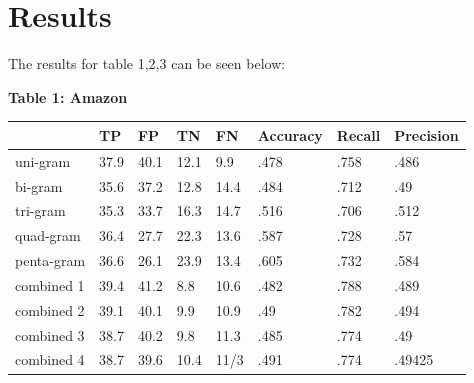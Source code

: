 \documentclass[12pt]{article}
\begin{document}
\section{Results}
The results for table 1,2,3 can be seen below: 
 \begin{flushleft}
\begin{table}[hbt!]
    \begin{center}
       \textbf{Table 1: Amazon} \\
       \end{center}
        \begin{tabular}{l|l|l|l|l|l|l|l|}
            \cline{2-7}
            
            \cline{2-7}
             & TP & FP & TN & FN  & Accuracy & Recall & Precision\\
            \hline
            \multicolumn{1}{|l|}{uni-gram} & 37.9 & 40.1 & 12.1 & 9.9 & .478 & .758  & .486 \\
            \hline
            \hline
            \multicolumn{1}{|l|}{bi-gram} & 35.6 & 37.2 & 12.8 & 14.4 & .484 & .712  & .49  \\
            \hline
            \hline
            \multicolumn{1}{|l|}{tri-gram} & 35.3 & 33.7 & 16.3  & 14.7 & .516 & .706  & .512 \\
            \hline
            \hline
            \multicolumn{1}{|l|}{quad-gram} & 36.4 & 27.7 & 22.3  & 13.6 & .587 & .728 & .57 \\
            \hline
            \hline
            \multicolumn{1}{|l|}{penta-gram} & 36.6 & 26.1 & 23.9  & 13.4 & .605  & .732  & .584 \\
            \hline
            \hline
            \multicolumn{1}{|l|}{combined 1} & 39.4 & 41.2 & 8.8  & 10.6 & .482 & .788  & .489 \\
            \hline
            \hline
            \multicolumn{1}{|l|}{combined 2} & 39.1 & 40.1 & 9.9  & 10.9 & .49  & .782  & .494 \\
            \hline
            \hline
            \multicolumn{1}{|l|}{combined 3} & 38.7 & 40.2 & 9.8  & 11.3 & .485  & .774  & .49 \\
            \hline
            \hline
            \multicolumn{1}{|l|}{combined 4} & 38.7 & 39.6 & 10.4 & 11/3 & .491  & .774  & .49425 \\
            \hline
        \end{tabular}
        
    \end{table}
 \end{flushleft}
 
\end{document}

